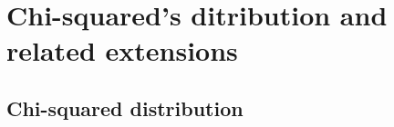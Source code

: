 % 	
%
%
%

\chapter{Chi-squared's ditribution and related extensions}
\section{Chi-squared distribution}\label{chisquared}
